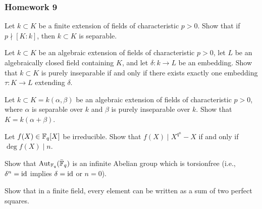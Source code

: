 \subsubsection{Homework 9}
\begin{problem}
  Let $k\subset K$ be a finite extension of fields of characteristic
  $p>0$. Show that if $p\nmid[K:k]$, then $k\subset K$ is separable.
\end{problem}
\begin{solution}
\end{solution}

\begin{problem}
  Let $k\subset K$ be an algebraic extension of fields of characteristic
  $p>0$, let $L$ be an algebraically closed field containing $K$, and let
  $\delta\colon k\to L$ be an embedding. Show that $k\subset K$ is purely
  inseparable if and only if there exists exactly one embedding
  $\tau\colon K\to L$ extending $\delta$.
\end{problem}
\begin{solution}
\end{solution}

\begin{problem}
  Let $k\subset K=k(\alpha,\beta)$ be an algebraic extension of fields of
  characteristic $p>0$, where $\alpha$ is separable over $k$ and $\beta$ is
  purely inseparable over $k$. Show that $K=k(\alpha+\beta)$.
\end{problem}
\begin{solution}
\end{solution}

\begin{problem}
  Let $f(X)\in\mathbb{F}_q[X]$ be irreducible. Show that $f(X)\mid X^{q^n}-X$ if
  and only if $\deg f(X)\mid n$.
\end{problem}
\begin{solution}
\end{solution}

\begin{problem}
  Show that $\operatorname{Aut}_{\mathbb{F}_q}(\bar{\mathbb{F}}_q)$ is an infinite Abelian group which
  is torsionfree (i.e., $\delta^n=\operatorname{id}$ implies $\delta=\operatorname{id}$ or $n=0$).
\end{problem}
\begin{solution}
\end{solution}

\begin{problem}
  Show that in a finite field, every element can be written as a sum of two
  perfect squares.
\end{problem}
\begin{solution}
\end{solution}

